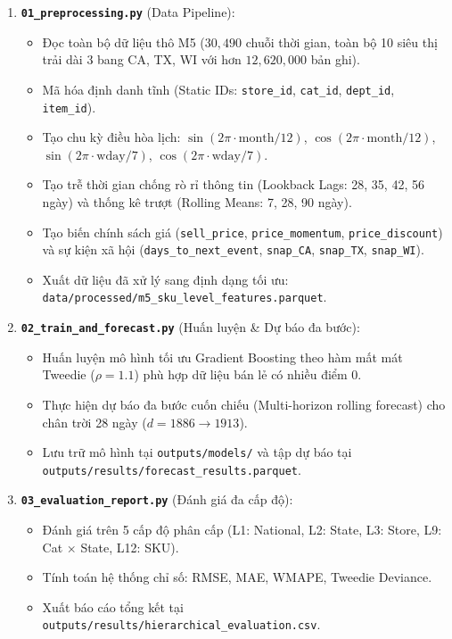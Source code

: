 \documentclass[12pt,a4paper,oneside]{article}
\begin{document}
\begin{enumerate}
    \item \textbf{\texttt{01\_preprocessing.py}} (Data Pipeline):
    \begin{itemize}
        \item Đọc toàn bộ dữ liệu thô M5 ($30{,}490$ chuỗi thời gian, toàn bộ 10 siêu thị trải dài 3 bang CA, TX, WI với hơn $12{,}620{,}000$ bản ghi).
        \item Mã hóa định danh tĩnh (Static IDs: \texttt{store\_id}, \texttt{cat\_id}, \texttt{dept\_id}, \texttt{item\_id}).
        \item Tạo chu kỳ điều hòa lịch: $\sin(2\pi \cdot \text{month}/12)$, $\cos(2\pi \cdot \text{month}/12)$, $\sin(2\pi \cdot \text{wday}/7)$, $\cos(2\pi \cdot \text{wday}/7)$.
        \item Tạo trễ thời gian chống rò rỉ thông tin (Lookback Lags: 28, 35, 42, 56 ngày) và thống kê trượt (Rolling Means: 7, 28, 90 ngày).
        \item Tạo biến chính sách giá (\texttt{sell\_price}, \texttt{price\_momentum}, \texttt{price\_discount}) và sự kiện xã hội (\texttt{days\_to\_next\_event}, \texttt{snap\_CA}, \texttt{snap\_TX}, \texttt{snap\_WI}).
        \item Xuất dữ liệu đã xử lý sang định dạng tối ưu: \texttt{data/processed/m5\_sku\_level\_features.parquet}.
    \end{itemize}

    \item \textbf{\texttt{02\_train\_and\_forecast.py}} (Huấn luyện \& Dự báo đa bước):
    \begin{itemize}
        \item Huấn luyện mô hình tối ưu Gradient Boosting theo hàm mất mát Tweedie ($\rho = 1.1$) phù hợp dữ liệu bán lẻ có nhiều điểm 0.
        \item Thực hiện dự báo đa bước cuốn chiếu (Multi-horizon rolling forecast) cho chân trời 28 ngày ($d = 1886 \rightarrow 1913$).
        \item Lưu trữ mô hình tại \texttt{outputs/models/} và tập dự báo tại \texttt{outputs/results/forecast\_results.parquet}.
    \end{itemize}

    \item \textbf{\texttt{03\_evaluation\_report.py}} (Đánh giá đa cấp độ):
    \begin{itemize}
        \item Đánh giá trên 5 cấp độ phân cấp (L1: National, L2: State, L3: Store, L9: Cat $\times$ State, L12: SKU).
        \item Tính toán hệ thống chỉ số: RMSE, MAE, WMAPE, Tweedie Deviance.
        \item Xuất báo cáo tổng kết tại \texttt{outputs/results/hierarchical\_evaluation.csv}.
    \end{itemize}


\end{enumerate}
\end{document}
